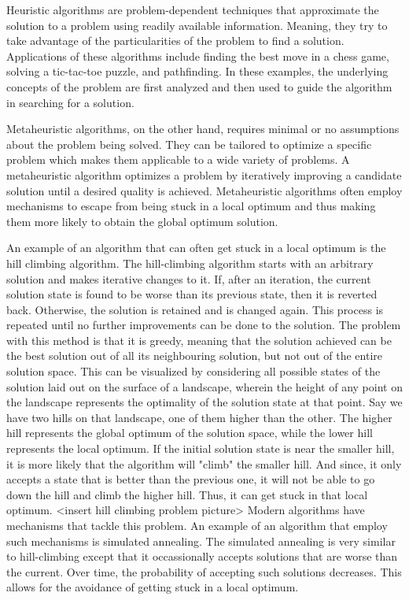 Heuristic algorithms are problem-dependent techniques that approximate the solution to a problem using readily available information. Meaning, they try to take advantage of the particularities of the problem to find a solution. Applications of these algorithms include finding the best move in a chess game, solving a tic-tac-toe puzzle, and pathfinding. In these examples, the underlying concepts of the problem are first analyzed and then used to guide the algorithm in searching for a solution. 

Metaheuristic algorithms, on the other hand, requires minimal or no assumptions about the problem being solved. They can be tailored to optimize a specific problem which makes them applicable to a wide variety of problems. A metaheuristic algorithm optimizes a problem by iteratively improving a candidate solution until a desired quality is achieved. Metaheuristic algorithms often employ mechanisms to escape from being stuck in a local optimum and thus making them more likely to obtain the global optimum solution. 

An example of an algorithm that can often get stuck in a local optimum is the hill climbing algorithm. The hill-climbing algorithm starts with an arbitrary solution and makes iterative changes to it. If, after an iteration, the current solution state is found to be worse than its previous state, then it is reverted back. Otherwise, the solution is retained and is changed again. This process is repeated until no further improvements can be done to the solution. The problem with this method is that it is greedy, meaning that the solution achieved can be the best solution out of all its neighbouring solution, but not out of the entire solution space. This can be visualized by considering all possible states of the solution laid out on the surface of a landscape, wherein the height of any point on the landscape represents the optimality of the solution state at that point. Say we have two hills on that landscape, one of them higher than the other. The higher hill represents the global optimum of the solution space, while the lower hill represents the local optimum. If the initial solution state is near the smaller hill, it is more likely that the algorithm will "climb" the smaller hill. And since, it only accepts a state that is better than the previous one, it will not be able to go down the hill and climb the higher hill. Thus, it can get stuck in that local optimum. 
<insert hill climbing problem picture>
Modern algorithms have mechanisms that tackle this problem. An example of an algorithm that employ such mechanisms is simulated annealing. The simulated annealing is very similar to hill-climbing except that it occassionally accepts solutions that are worse than the current. Over time, the probability of accepting such solutions decreases. This allows for the avoidance of getting stuck in a local optimum.

